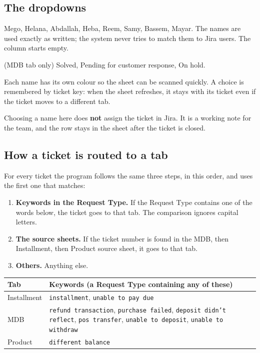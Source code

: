 \documentclass[11pt,a4paper]{article}
\newcommand{\code}[1]{\texttt{#1}}
\let\oldsubsection\subsection
\renewcommand{\subsection}{\needspace{7\baselineskip}\oldsubsection}
\begin{document}
\subsection{The dropdowns}
\begin{description}[leftmargin=!,labelwidth=3.4cm]
  \item[Assignee] Mego, Helana, Abdallah, Heba, Reem, Samy, Bassem, Mayar. The names are used exactly as written; the
    system never tries to match them to Jira users. The column starts empty.
  \item[Resolved] (MDB tab only) Solved, Pending for customer response, On hold.
\end{description}
Each name has its own colour so the sheet can be scanned quickly. A choice is remembered by ticket key: when the sheet
refreshes, it stays with its ticket even if the ticket moves to a different tab.

\begin{warning}
Choosing a name here does \textbf{not} assign the ticket in Jira. It is a working note for the team, and the row stays
in the sheet after the ticket is closed.
\end{warning}

\subsection{How a ticket is routed to a tab}
\label{sec:routing}
For every ticket the program follows the same three steps, in this order, and uses the first one that matches:
\begin{enumerate}
  \item \textbf{Keywords in the Request Type.} If the Request Type contains one of the words below, the ticket goes to
    that tab. The comparison ignores capital letters.
  \item \textbf{The source sheets.} If the ticket number is found in the MDB, then Installment, then Product source
    sheet, it goes to that tab.
  \item \textbf{Others.} Anything else.
\end{enumerate}

\begin{tabularx}{\linewidth}{@{}l L@{}}
\toprule
\textbf{Tab} & \textbf{Keywords (a Request Type containing any of these)} \\
\midrule
Installment & \code{installment}, \code{unable to pay due} \\
MDB & \code{refund transaction}, \code{purchase failed}, \code{deposit didn't reflect}, \code{pos transfer},
\code{unable to deposit}, \code{unable to withdraw} \\
Product & \code{different balance} \\
\bottomrule
\end{tabularx}
\end{document}
